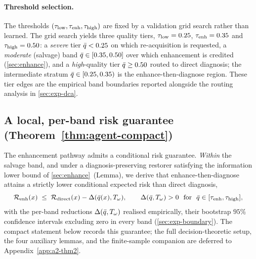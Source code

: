 \paragraph{Threshold selection.}
The thresholds $(\tau_{\mathrm{low}},\tau_{\mathrm{enh}},\tau_{\mathrm{high}})$ are fixed by a validation grid search rather than
learned. The grid search yields three quality tiers, $\tau_{\mathrm{low}}=0.25$, $\tau_{\mathrm{enh}}=0.35$ and
$\tau_{\mathrm{high}}=0.50$: a \emph{severe} tier $\bar{q}<0.25$ on which re-acquisition is requested, a
\emph{moderate} (salvage) band $\bar{q}\in[0.35,0.50]$ over which enhancement is credited
(\cref{sec:enhance}), and a \emph{high}-quality tier $\bar{q}\geq0.50$ routed to direct diagnosis;
the intermediate stratum $\bar{q}\in[0.25,0.35)$ is the enhance-then-diagnose region. These tier
edges are the empirical band boundaries reported alongside the routing analysis in
\cref{sec:exp-dca}.

\subsection{A local, per-band risk guarantee (Theorem~\ref{thm:agent-compact})}\label{sec:agent-thm2}
The enhancement pathway admits a conditional risk guarantee. \emph{Within} the salvage band, and
under a diagnosis-preserving restorer satisfying the information lower bound of
\cref{sec:enhance}~(Lemma), we derive that enhance-then-diagnose attains a strictly lower
conditional expected risk than direct diagnosis,
\begin{equation}
\mathcal{R}_{\mathrm{enh}}(x)\;\leq\;\mathcal{R}_{\mathrm{direct}}(x)-\Delta(\bar{q}(x),T_\omega),
\qquad
\Delta(\bar{q},T_\omega)>0\ \ \text{for}\ \ \bar{q}\in[\tau_{\mathrm{enh}},\tau_{\mathrm{high}}],
\label{eq:thm2-band}
\end{equation}
with the per-band reductions $\Delta(\bar{q},T_\omega)$ realised empirically, their bootstrap $95\%$
confidence intervals excluding zero in every band (\cref{sec:exp-boundary}). The compact statement
below records this guarantee; the full decision-theoretic setup, the four auxiliary lemmas, and the
finite-sample companion are deferred to Appendix~\ref{app:a2-thm2}.



